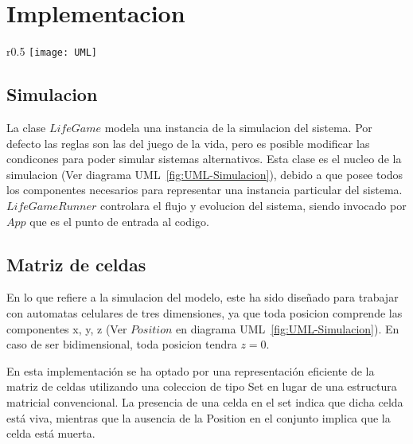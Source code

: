\section{Implementacion}\label{sec:implementacion}

\begin{wrapfigure}{r}{0.5\textwidth}
    \centering
    \texttt{[image: UML]}
    \caption{Diagrama UML}
    \label{fig:UML-Simulacion}
\end{wrapfigure}

\subsection{Simulacion}\label{label:simulacion}
    La clase $LifeGame$ modela una instancia de la simulacion del sistema. Por defecto las reglas son las del juego de la vida,
    pero es posible modificar las condicones para poder simular sistemas alternativos. Esta clase es el nucleo de la
    simulacion (Ver diagrama UML~\ref{fig:UML-Simulacion}), debido a que posee todos los componentes necesarios
    para representar una instancia particular del sistema. $LifeGameRunner$ controlara el flujo y evolucion del sistema,
    siendo invocado por $App$ que es el punto de entrada al codigo.

\subsection{Matriz de celdas}\label{subsec:matriz de celdas}
    En lo que refiere a la simulacion del modelo, este ha sido diseñado para trabajar con automatas celulares de tres
    dimensiones, ya que toda posicion comprende las componentes x, y, z (Ver $Position$ en diagrama UML~\ref{fig:UML-Simulacion}).
    En caso de ser bidimensional, toda posicion tendra $z = 0$.

    En esta implementación se ha optado por una representación eficiente de la matriz de celdas utilizando una coleccion de
    tipo Set en lugar de una estructura matricial convencional.
    La presencia de una celda en el set indica que dicha celda está viva, mientras que la ausencia de la Position en
    el conjunto implica que la celda está muerta.

